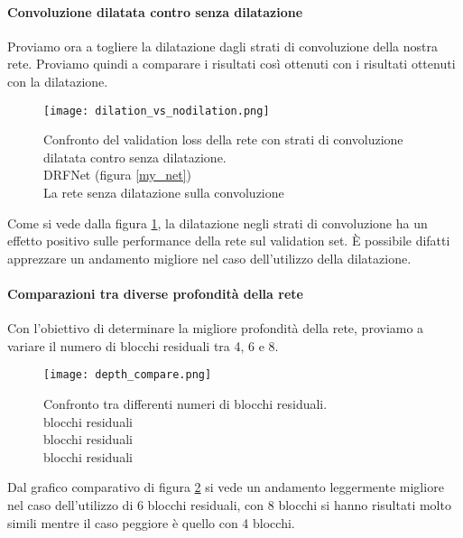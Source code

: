 \paragraph{Convoluzione dilatata contro senza dilatazione} Proviamo ora a togliere la dilatazione dagli strati di convoluzione della nostra rete. Proviamo quindi a comparare i risultati così ottenuti con i risultati ottenuti con la dilatazione.
\begin{figure}[H]
    \centering
    \texttt{[image: dilation\_vs\_nodilation.png]}
    \caption[Confronto del validation loss della rete con strati di convoluzione dilatata contro senza dilatazione]{
        Confronto del validation loss della rete con strati di convoluzione dilatata contro senza dilatazione. \\
        \quad DRFNet (figura \ref{my_net})\\
        \quad La rete senza dilatazione sulla convoluzione
    }
    \label{dilation_vs_nodilation}
\end{figure}
Come si vede dalla figura \ref{dilation_vs_nodilation}, la dilatazione negli strati di convoluzione ha un effetto positivo sulle performance della rete sul validation set. È possibile difatti apprezzare un andamento migliore nel caso dell'utilizzo della dilatazione.

\paragraph{Comparazioni tra diverse profondità della rete}
Con l'obiettivo di determinare la migliore profondità della rete, proviamo a variare il numero di blocchi residuali tra 4, 6 e 8. 
\begin{figure}[H]
    \centering
    \texttt{[image: depth\_compare.png]}
    \caption[Confronto tra differenti numeri di blocchi residuali]{
        Confronto tra differenti numeri di blocchi residuali. \\
         blocchi residuali\\
         blocchi residuali\\
         blocchi residuali
    }
    \label{depth_compare}
\end{figure}
Dal grafico comparativo di figura \ref{depth_compare} si vede un andamento leggermente migliore nel caso dell'utilizzo di 6 blocchi residuali, con 8 blocchi si hanno risultati molto simili mentre il caso peggiore è quello con 4 blocchi.